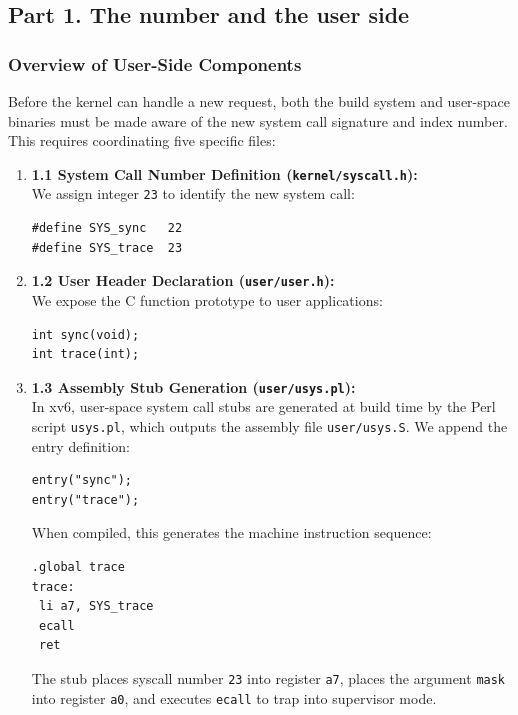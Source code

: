 \documentclass{labreport}
\begin{document}
\subsection{Part 1. The number and the user side}

\subsubsection{Overview of User-Side Components}
Before the kernel can handle a new request, both the build system and user-space binaries must be made aware of the new system call signature and index number. This requires coordinating five specific files:

\begin{enumerate}[leftmargin=*]
    \item \textbf{1.1 System Call Number Definition (\texttt{kernel/syscall.h}):}\\
    We assign integer \texttt{23} to identify the new system call:
\begin{lstlisting}[style=c]
#define SYS_sync   22
#define SYS_trace  23
\end{lstlisting}

    \item \textbf{1.2 User Header Declaration (\texttt{user/user.h}):}\\
    We expose the C function prototype to user applications:
\begin{lstlisting}[style=c]
int sync(void);
int trace(int);
\end{lstlisting}

    \item \textbf{1.3 Assembly Stub Generation (\texttt{user/usys.pl}):}\\
    In xv6, user-space system call stubs are generated at build time by the Perl script \texttt{usys.pl}, which outputs the assembly file \texttt{user/usys.S}. We append the entry definition:
\begin{lstlisting}[style=bash]
entry("sync");
entry("trace");
\end{lstlisting}
    When compiled, this generates the machine instruction sequence:
\begin{lstlisting}[style=bash]
.global trace
trace:
 li a7, SYS_trace
 ecall
 ret
\end{lstlisting}
    The stub places syscall number \texttt{23} into register \texttt{a7}, places the argument \texttt{mask} into register \texttt{a0}, and executes \texttt{ecall} to trap into supervisor mode.


\end{enumerate}
\end{document}
